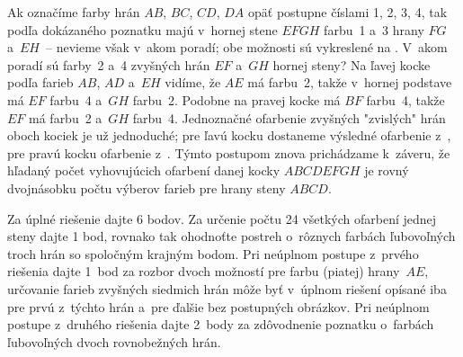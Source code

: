 {Ak označíme farby hrán $AB$, $BC$, $CD$, $DA$ opäť postupne číslami
1, 2, 3, 4, tak podľa dokázaného poznatku
majú v~hornej stene $EFGH$ farbu~1 a~3 hrany $FG$ a~$EH$~--
nevieme však v~akom poradí;
obe možnosti sú vykreslené na \obr.
%
V~akom poradí sú farby~2 a~4 zvyšných hrán $EF$ a~$GH$
hornej steny? Na ľavej kocke podľa farieb $AB$, $AD$ a~$EH$
vidíme, že $AE$ má farbu~2, takže v~hornej podstave má $EF$ farbu~4
a~$GH$ farbu~2. Podobne na pravej kocke má $BF$ farbu~4, takže
$EF$ má farbu~2 a~$GH$ farbu~4. Jednoznačné ofarbenie
zvyšných "zvislých" hrán oboch kociek je už jednoduché; pre
ľavú kocku dostaneme výsledné ofarbenie z~, pre pravú
kocku ofarbenie z~. Týmto
postupom znova prichádzame k~záveru, že hľadaný počet vyhovujúcich
ofarbení danej kocky $ABCDEFGH$ je rovný dvojnásobku počtu
výberov farieb pre hrany steny $ABCD$.

\nobreak\medskip\petit\noindent
Za úplné riešenie dajte 6 bodov. Za určenie počtu 24 všetkých
ofarbení jednej steny dajte 1 bod, rovnako tak ohodnoťte postreh
o~rôznych farbách ľubovoľných troch hrán so spoločným krajným bodom.
Pri neúplnom postupe z~prvého riešenia dajte 1~bod za rozbor dvoch
možností pre farbu (piatej) hrany~$AE$, určovanie farieb zvyšných
siedmich hrán môže byť v~úplnom riešení opísané iba pre
prvú z~týchto hrán a~pre ďalšie bez postupných obrázkov.
Pri neúplnom postupe z~druhého riešenia dajte 2~body
za zdôvodnenie poznatku o~farbách ľubovoľných dvoch rovnobežných hrán.

\endpetit
\bigbreak
}

